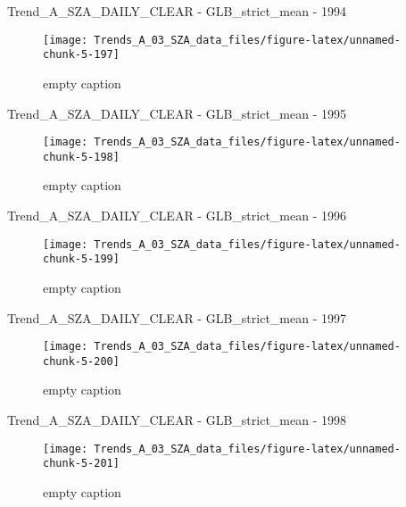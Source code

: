 \documentclass[
  10pt,
  a4paper,oneside]{article}
\begin{document}
Trend\_A\_SZA\_DAILY\_CLEAR - GLB\_strict\_mean - 1994

\begin{figure}[!ht]

{\centering \texttt{[image: Trends\_A\_03\_SZA\_data\_files/figure-latex/unnamed-chunk-5-197]} 

}

\caption{ empty caption }\label{fig:unnamed-chunk-5-197}
\end{figure}

Trend\_A\_SZA\_DAILY\_CLEAR - GLB\_strict\_mean - 1995

\begin{figure}[!ht]

{\centering \texttt{[image: Trends\_A\_03\_SZA\_data\_files/figure-latex/unnamed-chunk-5-198]} 

}

\caption{ empty caption }\label{fig:unnamed-chunk-5-198}
\end{figure}

Trend\_A\_SZA\_DAILY\_CLEAR - GLB\_strict\_mean - 1996

\begin{figure}[!ht]

{\centering \texttt{[image: Trends\_A\_03\_SZA\_data\_files/figure-latex/unnamed-chunk-5-199]} 

}

\caption{ empty caption }\label{fig:unnamed-chunk-5-199}
\end{figure}

Trend\_A\_SZA\_DAILY\_CLEAR - GLB\_strict\_mean - 1997

\begin{figure}[!ht]

{\centering \texttt{[image: Trends\_A\_03\_SZA\_data\_files/figure-latex/unnamed-chunk-5-200]} 

}

\caption{ empty caption }\label{fig:unnamed-chunk-5-200}
\end{figure}

Trend\_A\_SZA\_DAILY\_CLEAR - GLB\_strict\_mean - 1998

\begin{figure}[!ht]

{\centering \texttt{[image: Trends\_A\_03\_SZA\_data\_files/figure-latex/unnamed-chunk-5-201]} 

}

\caption{ empty caption }\label{fig:unnamed-chunk-5-201}
\end{figure}
\end{document}
